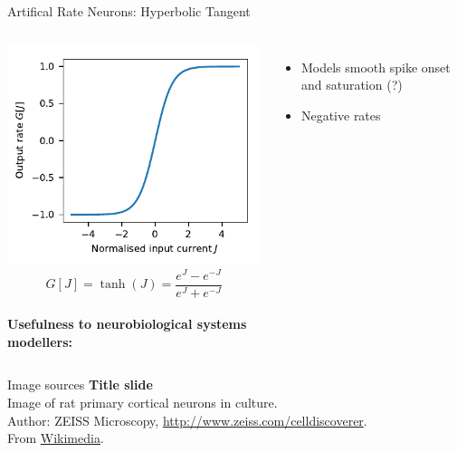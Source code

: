 \documentclass[handout,aspectratio=169]{beamer}
\begin{document}
\begin{frame}{Artifical Rate Neurons: Hyperbolic Tangent}
	\begin{columns}
	\includegraphics[width=\textwidth]{media/nonlinearity_tanh.pdf}%
	$$G[J] = \tanh(J) = \frac{e^J - e^{-J}}{e^J + e^{-J}}$$\\[0.5cm]
	\textbf{Usefulness to neurobiological systems\\modellers:}
	\begin{itemize}
		\item[\OMeh] Models smooth spike onset and saturation (?)
		\item[\OMinus] Negative rates
	\end{itemize}
	\end{columns}	
\end{frame}

\backupbegin

\begin{frame}[noframenumbering]{Image sources}
	\small
	\textbf{Title slide}\\Image of rat primary cortical neurons in culture.\\Author: ZEISS Microscopy, \url{http://www.zeiss.com/celldiscoverer}.\\From \href{https://commons.wikimedia.org/wiki/File:Rat_primary_cortical_neuron_culture,_deconvolved_z-stack_overlay_(30614937102).jpg}{Wikimedia}.
\end{frame}

\backupend
\end{document}
